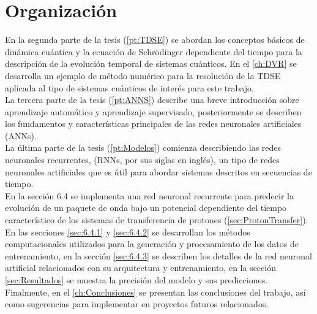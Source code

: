 \section{Organización}

\noindent En la segunda parte de la tesis (\autoref{pt:TDSE}) se abordan los conceptos básicos de dinámica cuántica y la ecuación de Schrödinger dependiente del tiempo para la descripción de la evolución temporal de sistemas cuánticos. En el \autoref{ch:DVR} se desarrolla un ejemplo de método numérico para la resolución de la \acs{TDSE} aplicada al tipo de sistemas cuánticos de interés para este trabajo.\\

La tercera parte de la tesis (\autoref{pt:ANNS}) describe una breve introducción sobre aprendizaje automático y aprendizaje supervisado, posteriormente se describen los fundamentos y características principales de las redes neuronales artificiales (\acs{ANN}s).\\


La última parte de la tesis (\autoref{pt:Modelos}) comienza describiendo las redes neuronales recurrentes, (\acs{RNN}s, por sus siglas en inglés), un tipo de redes neuronales artificiales que es útil para abordar sistemas descritos en secuencias de tiempo.\\
En la sección 6.4 se implementa una red neuronal recurrente para predecir la evolución de un paquete de onda bajo un potencial dependiente del tiempo característico de los sistemas de transferencia de protones (\autoref{sec:ProtonTransfer}). En las secciones \autoref{sec:6.4.1} y \autoref{sec:6.4.2} se desarrollan los métodos computacionales utilizados para la generación y procesamiento de los datos de entrenamiento, en la sección \autoref{sec:6.4.3} se describen los detalles de la red neuronal artificial relacionados con su arquitectura y entrenamiento, en la sección \autoref{sec:Resultados} se muestra la precisión del modelo y sus predicciones. Finalmente, en el \autoref{ch:Conclusiones} se presentan las conclusiones del trabajo, así como sugerencias para implementar en proyectos futuros relacionados.








